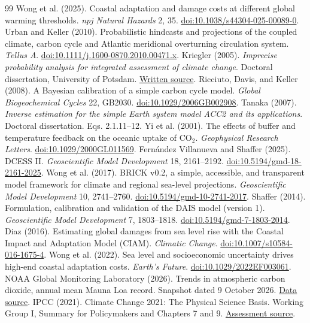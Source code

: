 \documentclass[11pt]{article}
\begin{document}
\begin{thebibliography}{99}
 Wong et al. (2025). Coastal adaptation and damage costs at
different global warming thresholds. \emph{npj Natural Hazards} 2, 35.
\href{https://doi.org/10.1038/s44304-025-00089-0}{doi:10.1038/s44304-025-00089-0}.
 Urban and Keller (2010). Probabilistic hindcasts and projections
of the coupled climate, carbon cycle and Atlantic meridional overturning
circulation system. \emph{Tellus A}.
\href{https://doi.org/10.1111/j.1600-0870.2010.00471.x}{doi:10.1111/j.1600-0870.2010.00471.x}.
 Kriegler (2005). \emph{Imprecise probability analysis for
integrated assessment of climate change}. Doctoral dissertation, University of Potsdam.
\href{https://www.pik-potsdam.de/members/edenh/theses/PhDKriegler.pdf}{Written source}.
 Ricciuto, Davis, and Keller (2008). A Bayesian calibration
of a simple carbon cycle model. \emph{Global Biogeochemical Cycles} 22, GB2030.
\href{https://doi.org/10.1029/2006GB002908}{doi:10.1029/2006GB002908}.
 Tanaka (2007). \emph{Inverse estimation for the simple Earth
system model ACC2 and its applications}. Doctoral dissertation. Eqs. 2.1.11--12.
 Yi et al. (2001). The effects of buffer and temperature feedback
on the oceanic uptake of CO$_2$. \emph{Geophysical Research Letters}.
\href{https://doi.org/10.1029/2000GL011569}{doi:10.1029/2000GL011569}.
 Fern\'andez Villanueva and Shaffer (2025). DCESS II.
\emph{Geoscientific Model Development} 18, 2161--2192.
\href{https://doi.org/10.5194/gmd-18-2161-2025}{doi:10.5194/gmd-18-2161-2025}.
 Wong et al. (2017). BRICK v0.2, a simple, accessible, and
transparent model framework for climate and regional sea-level projections.
\emph{Geoscientific Model Development} 10, 2741--2760.
\href{https://doi.org/10.5194/gmd-10-2741-2017}{doi:10.5194/gmd-10-2741-2017}.
 Shaffer (2014). Formulation, calibration and validation of
the DAIS model (version 1). \emph{Geoscientific Model Development} 7, 1803--1818.
\href{https://doi.org/10.5194/gmd-7-1803-2014}{doi:10.5194/gmd-7-1803-2014}.
 Diaz (2016). Estimating global damages from sea level rise with
the Coastal Impact and Adaptation Model (CIAM). \emph{Climatic Change}.
\href{https://doi.org/10.1007/s10584-016-1675-4}{doi:10.1007/s10584-016-1675-4}.
 Wong et al. (2022). Sea level and socioeconomic uncertainty
drives high-end coastal adaptation costs. \emph{Earth's Future}.
\href{https://doi.org/10.1029/2022EF003061}{doi:10.1029/2022EF003061}.
 NOAA Global Monitoring Laboratory (2026). Trends in atmospheric
carbon dioxide, annual mean Mauna Loa record. Snapshot dated 9 October 2026.
\href{https://gml.noaa.gov/webdata/ccgg/trends/co2/co2_annmean_mlo.txt}{Data source}.
 IPCC (2021). Climate Change 2021: The Physical Science Basis.
Working Group I, Summary for Policymakers and Chapters 7 and 9.
\href{https://www.ipcc.ch/report/ar6/wg1/}{Assessment source}.
\end{thebibliography}
\end{document}
